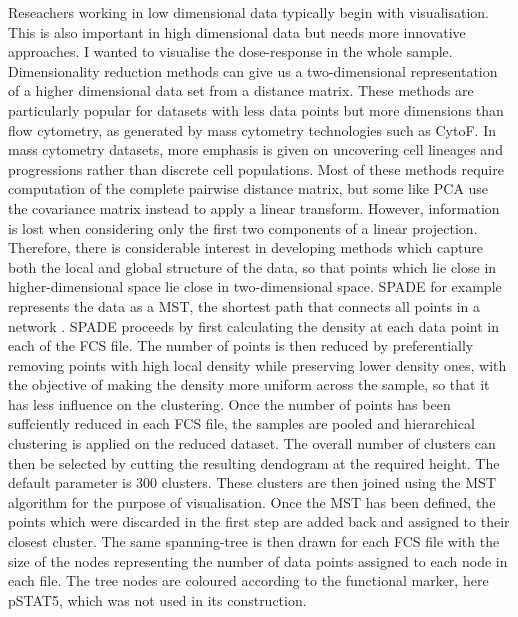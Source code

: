 Reseachers working in low dimensional data typically begin with visualisation.
This is also important in high dimensional data but needs more innovative approaches.
I wanted to visualise the dose-response in the whole sample.
Dimensionality reduction methods can give us a two-dimensional representation of a higher dimensional data set from a distance matrix.
These methods are particularly popular for datasets with less data points but more dimensions than flow cytometry,
as generated by mass cytometry technologies such as CytoF.
In mass cytometry datasets, more emphasis is given on uncovering cell lineages and progressions rather than discrete cell populations.
Most of these methods require computation of the complete pairwise distance matrix,
but some like \gls{PCA} use the covariance matrix instead to apply a linear transform.
However, information is lost when considering only the first two components of a linear projection.
Therefore, there is considerable interest in developing methods which capture both the local and global structure of the data,
so that points which lie close in higher-dimensional space lie close in two-dimensional space.
\acrfull{SPADE} for example represents the data as a \acrfull{MST}, the shortest path that connects all points in a network \citep{Simonds:2011jh}.
SPADE proceeds by first calculating the density at each data point in each of the FCS file.
The number of points is then reduced by preferentially removing 
points with high local density while preserving lower density ones,
with the objective of making the density more uniform across the sample,
so that it has less influence on the clustering.
Once the number of points has been suffciently reduced in each FCS file, the samples are pooled and hierarchical clustering is applied
on the reduced dataset.
The overall number of clusters can then be selected by cutting the resulting dendogram at the required height.
The default parameter is 300 clusters.
These clusters are then joined using the \acrfull{MST} algorithm for the purpose of visualisation.
Once the MST has been defined, the points which were discarded in the first step are added back and assigned to their closest cluster.
The same spanning-tree is then drawn for each FCS file with the size of the nodes representing the number of data points assigned to each node
in each file.
The tree nodes are coloured according to the functional marker, here pSTAT5, which was not used in its construction.  

